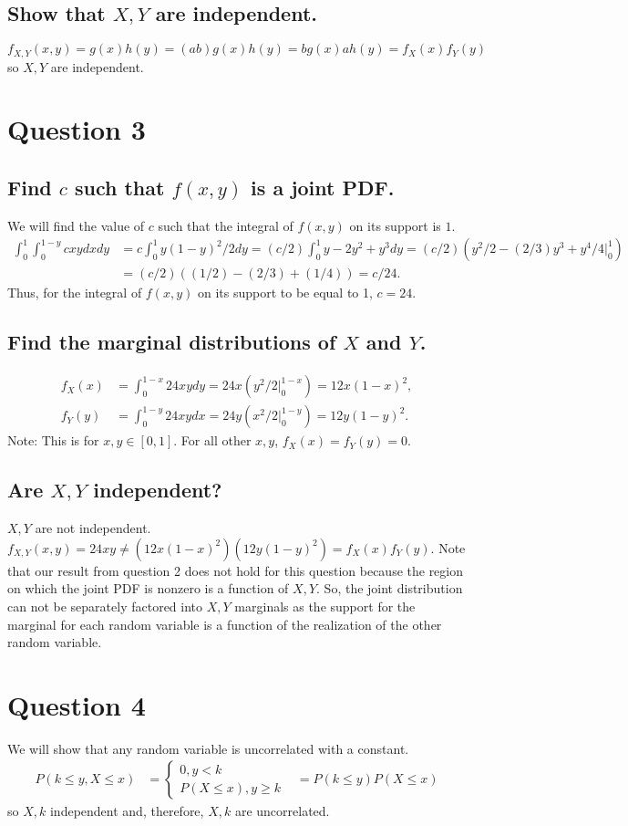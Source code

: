 \documentclass[11pt]{article} %
\begin{document}
\subsection{Show that $X,Y$ are independent.}
$f_{X,Y}(x,y) = g(x)h(y) =(ab)g(x)h(y) =  bg(x)ah(y) = f_X(x)f_Y(y)$ so $X,Y$ are independent.
\section{Question 3}
\subsection{Find $c$ such that $f(x,y)$ is a joint PDF.}
We will find the value of $c$ such that the integral of $f(x,y)$ on its support is $1$.
\begin{align*}
\int_{0}^{1}\int_{0}^{1 - y} cxy dxdy &= c\int_{0}^{1}y(1-y)^2/2 dy = (c/2)\int_{0}^{1}y-2y^2 +y^3 dy = (c/2)(y^2/2 - (2/3)y^3 + y^4/4|_{0}^{1})\\
&= (c/2)((1/2) - (2/3) + (1/4) ) = c/24.
\end{align*}
Thus, for the integral of $f(x,y)$ on its support to be equal to 1, $c = 24.$

\subsection{Find the marginal distributions of $X$ and $Y$.}
\begin{align*}
f_X(x) &= \int_{0}^{1-x}24xy dy = 24x(y^2/2|_{0}^{1-x}) = 12x(1-x)^2,\\
f_Y(y) &= \int_{0}^{1-y}24xy dx = 24y(x^2/2|_{0}^{1-y}) = 12y(1-y)^2.
\end{align*}
Note: This is for $x,y \in [0,1].$ For all other $x,y$, $f_X(x) = f_Y(y) = 0.$
\subsection{Are $X,Y$ independent?}
$X,Y$ are not independent. $f_{X,Y}(x,y) = 24xy \neq  (12x(1-x)^2)  (12y(1-y)^2) = f_X(x)f_Y(y).$ Note that our result from question 2 does not hold for this question because the region on which the joint PDF is nonzero is a function of $X,Y$. So, the joint distribution can not be separately factored into $X,Y$ marginals as the support for the marginal for each random variable is a function of the realization of the other random variable.
\section{Question 4}
We will show that any random variable is uncorrelated with a constant. 
\begin{align*}
P(k \leq y,X \leq x) &= \begin{cases} 0, y<k \\ P(X \leq x), y\geq k
\end{cases}
&= P(k \leq y)P(X \leq x)
\end{align*} so $X,k$ independent and, therefore, $X,k$ are uncorrelated.
\end{document}
